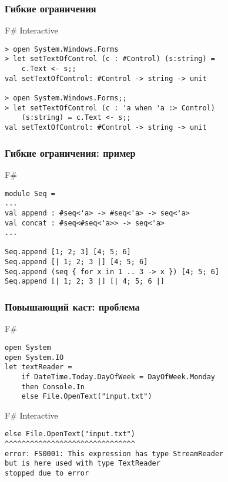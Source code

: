 \documentclass[xetex,mathserif,serif]{beamer}
\begin{document}
	\begin{frame}[fragile]
		\frametitle{Гибкие ограничения}
\begin{alertblock}{F\# Interactive}
\begin{lstlisting}[keywordstyle=\color{black}]
> open System.Windows.Forms
> let setTextOfControl (c : #Control) (s:string) = 
    c.Text <- s;;
val setTextOfControl: #Control -> string -> unit

> open System.Windows.Forms;;
> let setTextOfControl (c : 'a when 'a :> Control) 
    (s:string) = c.Text <- s;;
val setTextOfControl: #Control -> string -> unit
\end{lstlisting}
\end{alertblock}
\end{frame}

	\begin{frame}[fragile]
		\frametitle{Гибкие ограничения: пример}
		\begin{exampleblock}{F\#}
			\begin{lstlisting}
module Seq =
...
val append : #seq<'a> -> #seq<'a> -> seq<'a>
val concat : #seq<#seq<'a>> -> seq<'a>
...

Seq.append [1; 2; 3] [4; 5; 6]
Seq.append [| 1; 2; 3 |] [4; 5; 6]
Seq.append (seq { for x in 1 .. 3 -> x }) [4; 5; 6]
Seq.append [| 1; 2; 3 |] [| 4; 5; 6 |]
\end{lstlisting}
\end{exampleblock}
\end{frame}

	\begin{frame}[fragile]
		\frametitle{Повышающий каст: проблема}
		\begin{exampleblock}{F\#}
			\begin{lstlisting}
open System
open System.IO
let textReader =
    if DateTime.Today.DayOfWeek = DayOfWeek.Monday
    then Console.In
    else File.OpenText("input.txt")
\end{lstlisting}
\end{exampleblock}

\begin{alertblock}{F\# Interactive}
\begin{lstlisting}[keywordstyle=\color{black}]
else File.OpenText("input.txt")
^^^^^^^^^^^^^^^^^^^^^^^^^^^^^^^
error: FS0001: This expression has type StreamReader 
but is here used with type TextReader 
stopped due to error
\end{lstlisting}
\end{alertblock}
\end{frame}
\end{document}
